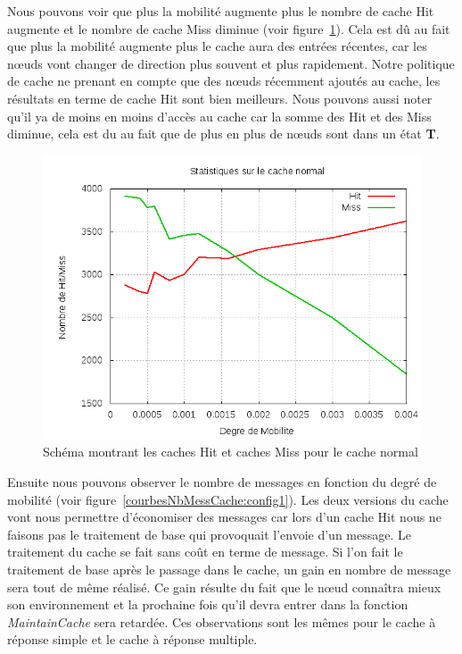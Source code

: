 \par Nous pouvons voir que plus la mobilité augmente plus le nombre de cache Hit augmente et le nombre de cache Miss diminue (voir figure~\ref{courbesHitMiss:config1}). Cela est dû au fait que plus la mobilité augmente plus le cache aura des entrées récentes, car les nœuds vont changer de direction plus souvent et plus rapidement. Notre politique de cache ne prenant en compte que des nœuds récemment ajoutés au cache, les résultats en terme de cache Hit sont bien meilleurs. Nous pouvons aussi noter qu'il ya de moins en moins d'accès au cache car la somme des Hit et des Miss diminue, cela est du au fait que de plus en plus de nœuds sont dans un état \textbf{T}. 

	\begin{figure}[!h]
        \centering
        \includegraphics[scale=0.5]{../CacheCode/SolipsisPeersim/resultats/Courbes/Courbes_Final_Rapport/Cache_Stats_Normal.png}
        \caption{Schéma montrant les caches Hit et caches Miss pour le cache normal}
        \label{courbesHitMiss:config1}
        \end{figure}
\newpage
\par Ensuite nous pouvons observer le nombre de messages en fonction du degré de mobilité (voir figure~\ref{courbesNbMessCache:config1}). Les deux versions du cache vont nous permettre d'économiser des messages car lors d'un cache Hit nous ne faisons pas le traitement de base qui provoquait l'envoie d'un message. Le traitement du cache se fait sans coût en terme de message. Si l'on fait le traitement de base après le passage dans le cache, un gain en nombre de message sera tout de même réalisé. Ce gain résulte du fait que le nœud connaîtra mieux son environnement et la prochaine fois qu'il devra entrer dans la fonction \textit{MaintainCache} sera retardée. Ces observations sont les mêmes pour le cache à réponse simple et le cache à réponse multiple.  


